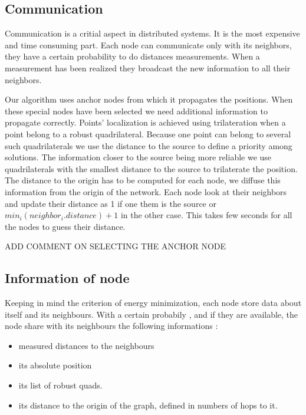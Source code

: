 \documentclass[letterpaper, 10 pt, conference]{ieeeconf}  %
\begin{document}


%

\subsection{Communication}
Communication is a critial aspect in distributed systems. It is the most expensive and time consuming part. Each node can communicate only with its neighbors, they have a certain probability to do distances measurements. When a measurement has been realized they broadcast the new information to all their neighbors.

Our algorithm uses anchor nodes from which it propagates the positions. When these special nodes have been selected we need additional information to propagate correctly. Points' localization is achieved using trilateration when a point belong to a robust quadrilateral. Because one point can belong to several such quadrilaterals we use the distance to the source to define a priority among solutions. The information closer to the source being more reliable we use quadrilaterals with the smallest distance to the source to trilaterate the position. The distance to the origin has to be computed for each node, we diffuse this information from the origin of the network. Each node look at their neighbors and update their distance as 1 if one them is the source or $min_i(neighbor_i.distance) +1 $ in the other case. This takes few seconds for all the nodes to guess their distance.

ADD COMMENT ON SELECTING THE ANCHOR NODE

\subsection{Information of node}

Keeping in mind the criterion of energy minimization, each node store data about itself and its neighbours. With a certain probabily , and if they are available, the node share with its neighbours the following informations :

\begin{itemize}

\item measured distances to the neighbours
\item its absolute position
\item its list of robust quads.
\item its distance to the origin of the graph, defined in numbers of hops to it.

\end{itemize}
\end{document}
